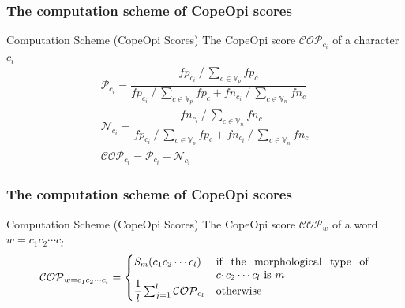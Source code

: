 \documentclass[mathserif]{beamer}
\DeclareMathOperator*{\divby}{/}
\begin{document}
\begin{frame}
\frametitle{The computation scheme of CopeOpi scores}
\begin{block}{Computation Scheme (CopeOpi Scores)}
The CopeOpi score $\mathcal{COP}_{c_i}$ of a character $c_i$
\begin{equation*}
\begin{gathered}
\mathcal{P}_{c_i} = \dfrac {
	fp_{c_i} \divby \sum_{c \in \mathbb{V}_p} fp_c
}{
	fp_{c_i} \divby \sum_{c \in \mathbb{V}_p} fp_c +
	fn_{c_i} \divby \sum_{c \in \mathbb{V}_n} fn_c
}
\\
\mathcal{N}_{c_i} = \dfrac {
	fn_{c_i} \divby \sum_{c \in \mathbb{V}_n} fn_c
}{
	fp_{c_i} \divby \sum_{c \in \mathbb{V}_p} fp_c +
	fn_{c_i} \divby \sum_{c \in \mathbb{V}_n} fn_c
}
\\
\mathcal{COP}_{c_i} = \mathcal{P}_{c_i} - \mathcal{N}_{c_i}
\end{gathered}
\end{equation*}
\end{block}
\begin{flushright}
\vspace{-9.5ex}
\end{flushright}
\end{frame}

\begin{frame}
\frametitle{The computation scheme of CopeOpi scores}
\begin{block}{Computation Scheme (CopeOpi Scores)}
The CopeOpi score $\mathcal{COP}_{w}$ of a word $w=c_1c_2 \cdots c_l$
\begin{equation*}
\mathcal{COP}_{w=c_1c_2 \cdots c_l} =
\begin{cases}
	\mathit{S}_m(c_1c_2 \cdots c_l)
	&\parbox[t]{.4\textwidth}{if the morphological type of $c_1c_2 \cdots c_l$ is $m$}\\
	\dfrac{1}{l} \sum_{j=1}^l \mathcal{COP}_{c_l}
	&\text{otherwise}
\end{cases}
\end{equation*}
\end{block}
\end{frame}
\end{document}
